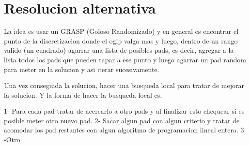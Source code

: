 \newpage
\section{Resolucion alternativa}
La idea es usar un GRASP (Goloso Randomizado) y en general es encontrar el punto de la discretizacion donde el ogip valga mas y luego, dentro de un rango valido (un cuadrado) agarrar una lista de posibles pads, es decir, agregar a la lista todos los pads que pueden tapar a ese punto y luego agarrar un pad random para meter en la solucion y asi iterar sucesivamente. 

Una vez conseguida la solucion, hacer una busqueda local para tratar de mejorar la solucion. Y la forma de hacer la busqueda local es.

1- Para cada pad tratar de acercarlo a otro pads y al finalizar esto chequear si es posible meter otro nuevo pad.
2- Sacar algun pad con algun criterio y tratar de acomodar los pad restantes con algun algoritmo de programacion lineal entera.
3 -Otro